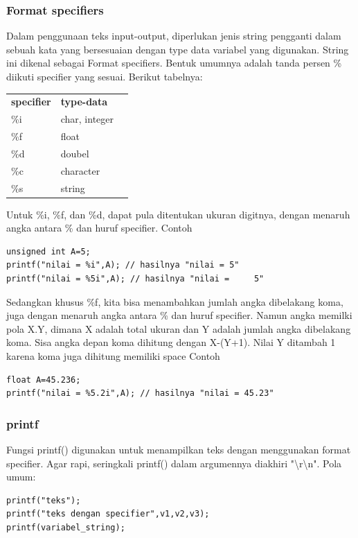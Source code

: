 \documentclass[12pt,]{article}
\begin{document}
	\subsubsection{Format specifiers}
	Dalam penggunaan teks input-output, diperlukan jenis string pengganti dalam sebuah kata yang bersesuaian dengan type data variabel yang digunakan.
	String ini dikenal sebagai Format specifiers.
	Bentuk umumnya adalah tanda persen \% diikuti specifier yang sesuai.
	Berikut tabelnya:
	
	\begin{table}[H]
		\begin{tabular}{|l|l|l}
			\cline{1-2}
			\textbf{specifier} & \textbf{type-data} \\ \cline{1-2}
			\%i & char, integer \\ \cline{1-2}
			\%f & float \\ \cline{1-2}
			\%d & doubel \\ \cline{1-2}
			\%c & character \\ \cline{1-2}
			\%s & string \\ \cline{1-2}
		\end{tabular}
	\end{table}

	Untuk \%i, \%f, dan \%d, dapat pula ditentukan ukuran digitnya, dengan menaruh angka antara \% dan huruf specifier. 
	Contoh
	\begin{verbatim}
unsigned int A=5;	
printf("nilai = %i",A); // hasilnya "nilai = 5"
printf("nilai = %5i",A); // hasilnya "nilai =     5"
	\end{verbatim}
	
	Sedangkan khusus \%f, kita bisa menambahkan jumlah angka dibelakang koma, juga dengan menaruh angka antara \% dan huruf specifier.
	Namun angka memilki pola X.Y, dimana X adalah total ukuran dan Y adalah jumlah angka dibelakang koma.
	Sisa angka depan koma dihitung dengan X-(Y+1).
	Nilai Y ditambah 1 karena koma juga dihitung memiliki space
	Contoh
	\begin{verbatim}
float A=45.236;	
printf("nilai = %5.2i",A); // hasilnya "nilai = 45.23"
	\end{verbatim}
	
	\subsubsection{printf}
	
	Fungsi printf() digunakan untuk menampilkan teks dengan menggunakan format specifier.
	Agar rapi, seringkali printf() dalam argumennya diakhiri "\textbackslash r\textbackslash n".
	Pola umum:
	\begin{verbatim}
printf("teks");
printf("teks dengan specifier",v1,v2,v3);
printf(variabel_string);
	\end{verbatim}
	
\end{document}
